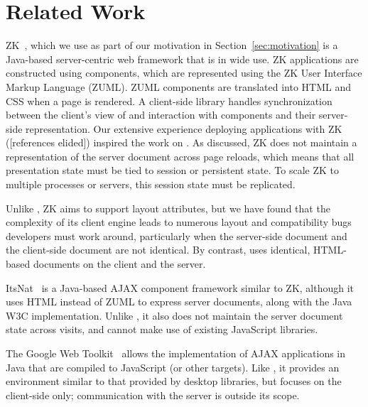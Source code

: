 \section{Related Work}
\label{sec:related}

ZK~\cite{ChenCheng:book2007},
which we use as part of our motivation in Section~\ref{sec:motivation}
is a Java-based server-centric web framework that is in wide use.
ZK applications are constructed using components, which are represented
using the ZK User Interface Markup Language (ZUML).  ZUML components
are translated into HTML and CSS when a page is rendered.
A client-side library handles synchronization between the client's 
view of and interaction with components and their server-side 
representation.  Our extensive experience deploying applications
with ZK ([references elided]) %
inspired the 
work on \cb.  As discussed, ZK does not maintain a representation
of the server document across page reloads, which means that
all presentation state must be tied to session or persistent state.
To scale ZK to multiple processes or servers, this session state must
be replicated.

Unlike \projectname{}, ZK aims to support layout attributes, but
we have found that the complexity of its client engine leads to 
numerous layout and compatibility bugs developers must work around,
particularly when the server-side document and the client-side
document are not identical.  By contrast, \cb uses identical, HTML-based
documents on the client and the server.

ItsNat~\cite{JoseMariaArranzSantamariaItsNat} is a Java-based AJAX
component framework similar to ZK, although it uses HTML instead of
ZUML to express server documents, along with the Java W3C implementation.  
Unlike \projectname, it also does not maintain the server document 
state across visits, and cannot make use of existing JavaScript libraries.

The Google Web Toolkit~\cite{GWT} allows the implementation of
AJAX applications in Java that are compiled to JavaScript (or other
targets).  Like \projectname, it provides an environment similar to 
that provided by desktop libraries, but focuses on the client-side only; 
communication with the server is outside its scope.



